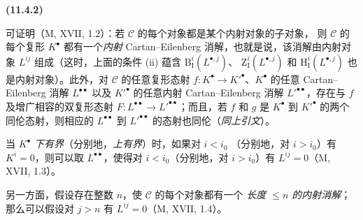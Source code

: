 \documentclass[UTF8,fontset=none,11pt,oneside,openany]{ctexbook}
\newenvironment{env}[1][]{%
  \par\medskip\noindent\textbf{(#1)}\ %
}{\par}
\begin{document}
\begin{env}[11.4.2]
可证明（M, XVII, 1.2）：若 $\mathcal C$ 的每个对象都是某个内射对象的子对象，
则 $\mathcal C$ 的每个复形 $K^\bullet$ 都有一个\emph{内射} Cartan--Eilenberg
消解，也就是说，该消解由内射对象 $L^{ij}$ 组成（这时，上面的条件 (ii) 蕴含
$\mathrm B_{\mathrm I}^i(L^{\bullet,j})$、
$\mathrm Z_{\mathrm I}^i(L^{\bullet,j})$ 和
$\mathrm H_{\mathrm I}^i(L^{\bullet,j})$ 也是内射对象）。此外，对
$\mathcal C$ 的任意复形态射 $f:K^\bullet\to K'^\bullet$、$K^\bullet$ 的任意
Cartan--Eilenberg 消解 $L^{\bullet\bullet}$ 以及 $K'^\bullet$ 的任意内射
Cartan--Eilenberg 消解 $L'^{\bullet\bullet}$，存在与 $f$ 及增广相容的双复形态射
$F:L^{\bullet\bullet}\to L'^{\bullet\bullet}$；而且，若 $f$ 和 $g$ 是
$K^\bullet$ 到 $K'^\bullet$ 的两个同伦态射，则相应的
$L^{\bullet\bullet}$ 到 $L'^{\bullet\bullet}$ 的态射也同伦（\emph{同上引文}）。

当 $K^\bullet$ \emph{下有界}（分别地，\emph{上有界}）时，如果对 $i<i_0$
（分别地，对 $i>i_0$）有 $K^i=0$，则可以取 $L^{\bullet\bullet}$，使得对
$i<i_0$（分别地，对 $i>i_0$）有 $L^{ij}=0$（M, XVII, 1.3）。

另一方面，假设存在整数 $n$，使 $\mathcal C$ 的每个对象都有一个
\emph{长度 $\leq n$ 的内射消解}；那么可以假设对 $j>n$ 有
$L^{ij}=0$（M, XVII, 1.4）。
\end{env}
\end{document}
